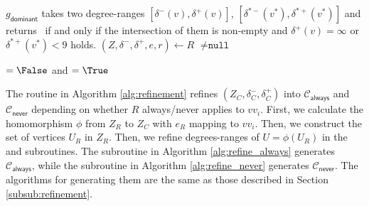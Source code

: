 \documentclass[main.tex]{subfiles}
\begin{document}
\begin{algorithm}[H]
    \caption{\dominantlyApplyWithLink($(Z^*, \delta^{*-}, \delta^{*+}), e^*, R$)}
    \label{alg:dominantly_apply}
    \begin{algorithmic}[1]
        \State $g_\textsf{dominant}$ takes two degree-ranges $[\delta^-(v), \delta^+(v)]$, $[\delta^{*-}(v^*), \delta^{*+}(v^*)]$ and returns \True\ if and only if the intersection of them is non-empty and $\delta^+(v)=\infty$ or $\delta^{*+}(v^*)<9$ holds.
        \State $(Z, \delta^-, \delta^+, e, r) \gets R$
        \State \Return {} $\neq \texttt{null}$
    \end{algorithmic}
\end{algorithm}

\begin{algorithm}[H]
    \caption{\shouldRefineWithLink($(Z_C, \delta_C^-, \delta_C^+), i, R$)}
    \label{alg:should_refine}
    \begin{algorithmic}[1]
        \State \Return {} $=\False$ and  $=\True$
    \end{algorithmic}
\end{algorithm}

The  routine in Algorithm \ref{alg:refinement} refines $(Z_C, \delta_C^-, \delta_C^+)$ into $\mathcal{C}_{\textsf{always}}$ and $\mathcal{C}_{\textsf{never}}$ depending on whether $R$ always/never applies to $vv_i$.
First, we calculate the homomorphism $\phi$ from $Z_R$ to $Z_C$ with $e_R$ mapping to $vv_i$.
Then, we construct the set of vertices $U_R$ in $Z_R$.
Then, we refine degrees-ranges of $U=\phi(U_R)$ in the  and  subroutines.
The  subroutine in Algorithm \ref{alg:refine_always} generates $\mathcal{C}_{\textsf{always}}$, while the  subroutine in Algorithm \ref{alg:refine_never} generates $\mathcal{C}_{\textsf{never}}$.
The algorithms for generating them are the same as those described in Section \ref{subsub:refinement}.
\end{document}
